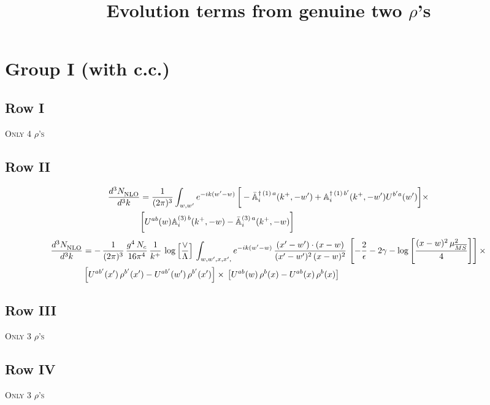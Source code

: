 \documentclass[9pt]{article}
\title{Evolution terms from genuine two $\rho$'s}
\author{}
\date{}
\def\mf#1{\mathbb{#1}}
\numberwithin{equation}{section}
\begin{document}
\maketitle
\section{Group I (with c.c.)}
\subsection{Row I}
\textsc{Only 4 $\rho$'s}
\subsection{{\color{green}Row II}}
\begin{align}
    \frac{d^{3}N_{\rm NLO}^{\rm}}{d^{3}k} &  = \frac{1}{(2\pi)^{3}}  \int_{w, w^\prime} e^{-ik(w^\prime-w)}\,\bigg[-\bar{\mf{A}}^{\dagger\,(1)\,a}_{i}(k^{+},-w^{\prime})+\mf{A}^{\dagger\, (1)\, b^{\prime}}_{i}(k^{+},-w^{\prime})U^{b^{\prime}a}(w^{\prime})\bigg]\times \notag \\ & \bigg[U^{ab}(w)\mf{A}^{(3)\, b}_{i}(k^{+},- w)-\Bar{\mf{A}}^{(3)\, a}_{i}(k^{+}, - w)\bigg]\nonumber
\end{align}
\begin{align}
     \frac{d^{3}N_{\rm NLO}^{\rm}}{d^{3}k} &  = -\,\frac{1}{(2\pi)^{3}}\, \frac{g^{4}\,N_{c}}{16\pi^{4}}\,\frac{1}{k^{+}}\,\log{\left[\frac{\vee}{\Lambda}\right]}\, \int_{w, w',x,x',} e^{-ik(w^\prime-w)}\, \frac{(x'-w')\cdot (x-w)}{(x'-w')^{2}\, (x-w)^{2}}\,\left[-\frac{2}{\epsilon}-2\gamma-\log{\left[\frac{(x-w)^{2}\,\mu^{2}_{\overline{MS}}}{4}\right]}\right]\times \notag \\ &  \left[U^{ab'}(x')\,\rho^{b'}(x') - U^{ab'}(w')\,\rho^{b'}(x')\right]\times\,\left[U^{ab}(w)\,\rho^{b}(x) - U^{ab}(x)\,\rho^{b}(x)\right]
\end{align}
\subsection{Row III}
\textsc{Only 3 $\rho$'s}
\subsection{Row IV}
\textsc{Only 3 $\rho$'s}
\end{document}
